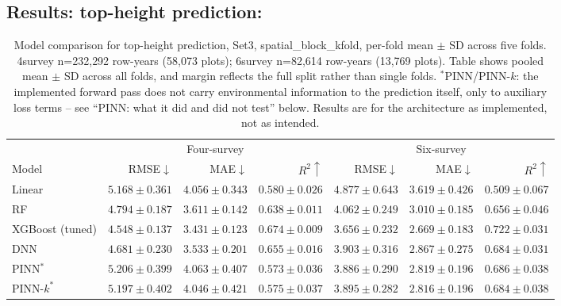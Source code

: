 \documentclass[logo,msc,ai]{infthesis}           %
\begin{document}
\subsection{Results: top-height prediction:}
\begin{table}[!htbp]
\centering
\scriptsize
\setlength{\tabcolsep}{4pt}
\renewcommand{\arraystretch}{1.2}
\begin{tabular}{lrrrrrr}
\toprule
& \multicolumn{3}{c}{Four-survey} & \multicolumn{3}{c}{Six-survey} \\
\cmidrule(lr){2-4} \cmidrule(lr){5-7}
Model & RMSE${\downarrow}$ & MAE${\downarrow}$ & $R^2{\uparrow}$ & RMSE${\downarrow}$ & MAE${\downarrow}$ & $R^2{\uparrow}$ \\
\midrule
Linear & $5.168{\pm}0.361$ & $4.056{\pm}0.343$ & $0.580{\pm}0.026$ & $4.877{\pm}0.643$ & $3.619{\pm}0.426$ & $0.509{\pm}0.067$ \\
RF & $4.794{\pm}0.187$ & $3.611{\pm}0.142$ & $0.638{\pm}0.011$ & $4.062{\pm}0.249$ & $3.010{\pm}0.185$ & $0.656{\pm}0.046$ \\
XGBoost (tuned) & $\mathbf{4.548{\pm}0.137}$ & $\mathbf{3.431{\pm}0.123}$ & $\mathbf{0.674{\pm}0.009}$ & $\mathbf{3.656{\pm}0.232}$ & $\mathbf{2.669{\pm}0.183}$ & $\mathbf{0.722{\pm}0.031}$ \\
DNN & $4.681{\pm}0.230$ & $3.533{\pm}0.201$ & $0.655{\pm}0.016$ & $3.903{\pm}0.316$ & $2.867{\pm}0.275$ & $0.684{\pm}0.031$ \\
PINN$^*$ & $5.206{\pm}0.399$ & $4.063{\pm}0.407$ & $0.573{\pm}0.036$ & $3.886{\pm}0.290$ & $2.819{\pm}0.196$ & $0.686{\pm}0.038$ \\
PINN-$k^*$ & $5.197{\pm}0.402$ & $4.046{\pm}0.421$ & $0.575{\pm}0.037$ & $3.895{\pm}0.282$ & $2.816{\pm}0.196$ & $0.684{\pm}0.038$ \\
\bottomrule
\end{tabular}
\caption{\small{Model comparison for top-height prediction, Set3, spatial\_block\_kfold,
per-fold mean $\pm$ SD across five folds. 4survey n=232{,}292 row-years (58{,}073
plots); 6survey n=82{,}614 row-years (13{,}769 plots). Table shows pooled mean $\pm$ SD across all folds, and margin reflects the full split rather than single folds.
$^*$PINN/PINN-$k$: the implemented forward pass does not carry environmental
information to the prediction itself, only to auxiliary loss terms -- see
``PINN: what it did and did not test'' below. Results are for the architecture
as implemented, not as intended.}}
\label{tab:results-rq1}
\end{table}
\end{document}
